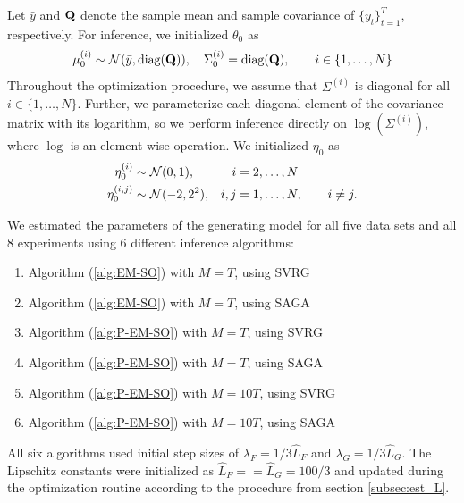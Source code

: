 Let $\bar y$ and $\mathbf{Q}$ denote the sample mean and sample covariance of $\{y_t\}_{t=1}^T$, respectively. For inference, we initialized $\theta_0$ as
%
\begin{equation*}
    \mu^{(i)}_0 \sim \mathcal{N}(\bar y, \text{diag}(\mathbf{Q})), \quad \Sigma^{(i)}_0 = \text{diag}(\mathbf{Q}), \qquad i \in \{1,\ldots,N\}
\end{equation*}
%
Throughout the optimization procedure, we assume that $\Sigma^{(i)}$ is diagonal for all $i \in \{1,\ldots,N\}$. Further, we parameterize each diagonal element of the covariance matrix with its logarithm, so we perform inference directly on $\log\left(\Sigma^{(i)}\right)$, where $\log$ is an element-wise operation.
%
We initialized $\eta_0$ as
%
\begin{align*}
    \eta^{(i)}_0 &\sim \mathcal{N}(0,1), & i & = 2,\ldots,N \\
    \eta^{(i,j)}_0 &\sim \mathcal{N}(-2,2^2), & i,j & = 1,\ldots,N, \qquad i \neq j.
\end{align*}
%

We estimated the parameters of the generating model for all five data sets and all 8 experiments using 6 different inference algorithms:
%
\begin{enumerate}
    \item Algorithm (\ref{alg:EM-SO}) with $M=T$, using SVRG
    \item Algorithm (\ref{alg:EM-SO}) with $M=T$, using SAGA
    \item Algorithm (\ref{alg:P-EM-SO}) with $M=T$, using SVRG
    \item Algorithm (\ref{alg:P-EM-SO}) with $M=T$, using SAGA
    \item Algorithm (\ref{alg:P-EM-SO}) with $M=10T$, using SVRG
    \item Algorithm (\ref{alg:P-EM-SO}) with $M=10T$, using SAGA
\end{enumerate}
%
All six algorithms used initial step sizes of $\lambda_F = 1/3 \hat L_F$ and $\lambda_G = 1/3 \hat L_G$. The Lipschitz constants were initialized as $\hat L_F = = \hat L_G = 100/3$ and updated during the optimization routine according to the procedure from section \ref{subsec:est_L}. 

